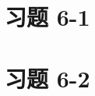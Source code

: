 \documentclass[UTF8,12pt,a4paper]{ctexart} %
\begin{document}
\section*{习题 6-1}



\section*{习题 6-2}


\end{document}
